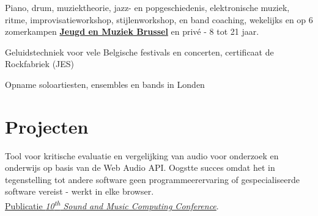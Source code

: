 \documentclass[a4paper]{deedy-resume} %
\begin{document}
\begin{minipage}[t]{0.65\textwidth}
%


\hspace{-0.1cm}
\begin{tightitemize}
\item Piano, drum, muziektheorie, jazz- en popgeschiedenis, elektronische muziek, ritme, improvisatieworkshop, stijlenworkshop, en band coaching, wekelijks en op 6 zomerkampen \href{http://www.jeugdenmuziekbrussel.be}{\textbf{Jeugd en Muziek Brussel}} en priv\'{e} - 8 tot 21 jaar.
\item Geluidstechniek voor vele Belgische festivals en concerten, certificaat de Rockfabriek (JES)
\item Opname soloartiesten, ensembles en bands in Londen
\end{tightitemize}

\sectionspace %


\section{Projecten}

\hspace{-0.1cm}

Tool voor kritische evaluatie en vergelijking van audio voor onderzoek en onderwijs op basis van de Web Audio API. Oogstte succes omdat het in tegenstelling tot andere software geen programmeerervaring of gespecialiseerde software vereist - werkt in elke browser.\\
\href{http://www.brechtdeman.com/publications/smc10.pdf}{Publicatie \emph{10\textsuperscript{th} Sound and Music Computing Conference}}. 


\end{minipage}
\end{document}
